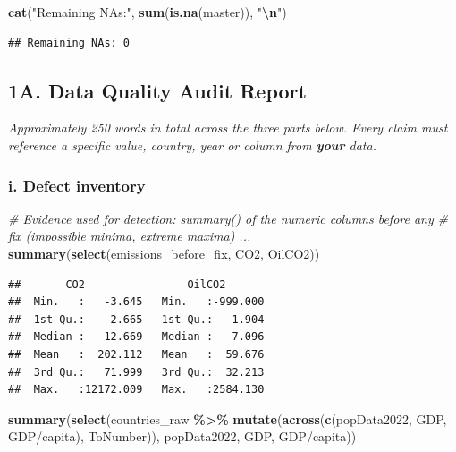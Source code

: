 \documentclass[
]{article}
\newenvironment{Shaded}{\begin{snugshade}}{\end{snugshade}}
\newcommand{\AttributeTok}[1]{\textcolor[rgb]{0.13,0.29,0.53}{#1}}
\newcommand{\CommentTok}[1]{\textcolor[rgb]{0.56,0.35,0.01}{\textit{#1}}}
\newcommand{\FunctionTok}[1]{\textcolor[rgb]{0.13,0.29,0.53}{\textbf{#1}}}
\newcommand{\NormalTok}[1]{#1}
\newcommand{\SpecialCharTok}[1]{\textcolor[rgb]{0.81,0.36,0.00}{\textbf{#1}}}
\newcommand{\StringTok}[1]{\textcolor[rgb]{0.31,0.60,0.02}{#1}}
\begin{document}
\begin{Shaded}
\begin{Highlighting}[]
\FunctionTok{cat}\NormalTok{(}\StringTok{"Remaining NAs:"}\NormalTok{, }\FunctionTok{sum}\NormalTok{(}\FunctionTok{is.na}\NormalTok{(master)), }\StringTok{"}\SpecialCharTok{\textbackslash{}n}\StringTok{"}\NormalTok{)}
\end{Highlighting}
\end{Shaded}

\begin{verbatim}
## Remaining NAs: 0
\end{verbatim}

\newpage

\subsection{1A. Data Quality Audit
Report}\label{a.-data-quality-audit-report}

\emph{Approximately 250 words in total across the three parts below.
Every claim must reference a specific value, country, year or column
from \textbf{your} data.}

\subsubsection{i. Defect inventory}\label{i.-defect-inventory}

\begin{Shaded}
\begin{Highlighting}[]
\CommentTok{\# Evidence used for detection: summary() of the numeric columns before any}
\CommentTok{\# fix (impossible minima, extreme maxima) ...}
\FunctionTok{summary}\NormalTok{(}\FunctionTok{select}\NormalTok{(emissions\_before\_fix, CO2, OilCO2))}
\end{Highlighting}
\end{Shaded}

\begin{verbatim}
##       CO2                OilCO2        
##  Min.   :   -3.645   Min.   :-999.000  
##  1st Qu.:    2.665   1st Qu.:   1.904  
##  Median :   12.669   Median :   7.096  
##  Mean   :  202.112   Mean   :  59.676  
##  3rd Qu.:   71.999   3rd Qu.:  32.213  
##  Max.   :12172.009   Max.   :2584.130
\end{verbatim}

\begin{Shaded}
\begin{Highlighting}[]
\FunctionTok{summary}\NormalTok{(}\FunctionTok{select}\NormalTok{(countries\_raw }\SpecialCharTok{\%\textgreater{}\%}
                 \FunctionTok{mutate}\NormalTok{(}\FunctionTok{across}\NormalTok{(}\FunctionTok{c}\NormalTok{(popData2022, GDP, }\StringTok{\textasciigrave{}}\AttributeTok{GDP/capita}\StringTok{\textasciigrave{}}\NormalTok{),}
\NormalTok{                               ToNumber)),}
\NormalTok{               popData2022, GDP, }\StringTok{\textasciigrave{}}\AttributeTok{GDP/capita}\StringTok{\textasciigrave{}}\NormalTok{))}
\end{Highlighting}
\end{Shaded}
\end{document}
